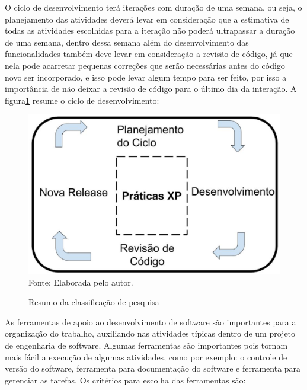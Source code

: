 O ciclo de desenvolvimento terá iterações com duração de uma semana, ou seja,
o planejamento das atividades deverá levar em consideração que a
estimativa de todas as atividades escolhidas para a iteração não poderá
ultrapassar a duração de uma semana, dentro dessa semana além do desenvolvimento
das funcionalidades também deve levar em consideração a revisão de código, já que
nela pode acarretar pequenas correções que serão necessárias antes do código novo
ser incorporado, e isso pode levar algum tempo para ser feito, por isso a importância
de não deixar a revisão de código para o último dia da interação. A figura\ref{fig:def}
resume o ciclo de desenvolvimento:

\begin{figure}[h]
  \centering
  \caption{Resumo da classificação de pesquisa}
  \includegraphics[width=1.0\textwidth]
      {figuras/desenvolvimento.eps}
  Fonte: Elaborada pelo autor.
\label{fig:def}
\end{figure}

As ferramentas de apoio ao desenvolvimento de software são importantes para a
organização do trabalho, auxiliando nas atividades típicas dentro de um projeto
de engenharia de software. Algumas ferramentas são importantes pois tornam mais fácil
a execução de algumas atividades, como por exemplo: o controle de versão do software,
ferramenta para documentação do software e ferramenta para gerenciar as tarefas.
Os critérios para escolha das ferramentas são:

